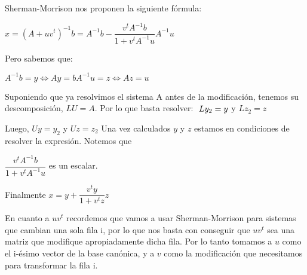 Sherman-Morrison nos proponen la siguiente fórmula:

$x = (A + uv^{t})^{-1} b = A^{-1}b -  \dfrac{v^{t}A^{-1}b}{1+v^{t}A^{-1}u} A^{-1}u$

Pero sabemos que:

$A^{-1}b = y \iff Ay = b 
A^{-1}u = z \iff Az = u $

Suponiendo que ya resolvimos el sistema A antes de la modificación, tenemos su descomposición, $ LU=A $. Por lo que basta resolver: $\\\
Ly_{2} = y $ y $ Lz_{2}=z$

Luego, $ Uy=y_{2} $ y $ Uz=z_{2}$
Una vez calculados $ y $ y $ z $ estamos en condiciones de resolver la expresión. Notemos que

$ \dfrac{v^{t}A^{-1}b}{1+v^{t}A^{-1}u} $ es un escalar.

Finalmente $ x = y +  \dfrac{v^{t}y}{1+v^{t}z} z$


En cuanto a $ uv^{t} $ recordemos que vamos a usar Sherman-Morrison para sistemas que cambian una sola fila i, por lo que nos basta con
conseguir que $ uv^{t} $ sea una matriz que modifique apropiadamente dicha fila. Por lo tanto tomamos a $u$ como el i-ésimo vector de la base canónica,
y a $v$ como la modificación que necesitamos para transformar la fila i.








